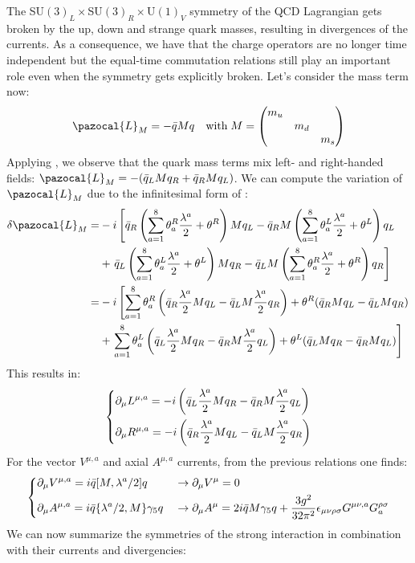 \documentclass[../main.tex]{subfiles}
\begin{document}
The SU$(3)_L\times$SU$(3)_R\times$U$(1)_V$ symmetry of the QCD Lagrangian gets broken by the up, down and strange quark masses, resulting in divergences of the currents. As a consequence, we have that the charge operators are no longer time independent but the equal-time commutation relations still play an important role even when the symmetry gets explicitly broken. Let's consider the mass term now:
\[
\pazocal{L}_M=-\Bar{q}Mq \quad \text{with}\;M=\mqty(\dmat{m_u,m_d,m_s})
\]
Applying , we observe that the quark mass terms mix left- and right-handed fields: $\pazocal{L}_M=-(\Bar{q}_LMq_R+\Bar{q}_RMq_L)$. We can compute the variation of $\pazocal{L}_M$ due to the infinitesimal form of :
\begin{align*}
\delta\pazocal{L}_M=&-i\left[\Bar{q}_R\left(\sum_{a=1}^8\theta_a^R\frac{\lambda^a}{2}+\theta^R\right)Mq_L-\Bar{q}_RM\left(\sum_{a=1}^8\theta_a^L\frac{\lambda^a}{2}+\theta^L\right)q_L\right.\\
&+\left.\Bar{q}_L\left(\sum_{a=1}^8\theta_a^L\frac{\lambda^a}{2}+\theta^L\right)Mq_R-\Bar{q}_LM\left(\sum_{a=1}^8\theta_a^R\frac{\lambda^a}{2}+\theta^R\right)q_R\right]\\
=&-i\left[\sum_{a=1}^8\theta_a^R\left(\Bar{q}_R\frac{\lambda^a}{2}Mq_L-\Bar{q}_LM\frac{\lambda^a}{2}q_R\right)+\theta^R(\Bar{q}_RMq_L-\Bar{q}_LMq_R)\right.\\
&+\left.\sum_{a=1}^8\theta_a^L\left(\Bar{q}_L\frac{\lambda^a}{2}Mq_R-\Bar{q}_RM\frac{\lambda^a}{2}q_L\right)+\theta^L(\Bar{q}_LMq_R-\Bar{q}_RMq_L)\right]
\end{align*}
This results in:
\[
\left\{
\begin{aligned}
&\partial_\mu L^{\mu,a}=-i\left(\Bar{q}_L\frac{\lambda^a}{2}Mq_R-\Bar{q}_RM\frac{\lambda^a}{2}q_L\right)\\
&\partial_\mu R^{\mu,a}=-i\left(\Bar{q}_R\frac{\lambda^a}{2}Mq_L-\Bar{q}_LM\frac{\lambda^a}{2}q_R\right)
\end{aligned}
\right.
\]
For the vector $V^{\mu,a}$ and axial $A^{\mu,a}$ currents, from the previous relations one finds:
\[
\left\{
\begin{aligned}
&\partial_\mu V^{\mu,a}=i\Bar{q}[M,\lambda^a/2]q&&\to\partial_\mu V^\mu=0\\
&\partial_\mu A^{\mu,a}=i\Bar{q}\{\lambda^a/2,M\}\gamma_5q&&\to\partial_\mu A^\mu=2i\Bar{q}M\gamma_5q+\frac{3g^2}{32\pi^2}\epsilon_{\mu\nu\rho\sigma}G^{\mu\nu,a}G^{\rho\sigma}_a
\end{aligned}
\right.
\]
We can now summarize the symmetries of the strong interaction in combination with their currents and divergencies:
\end{document}
